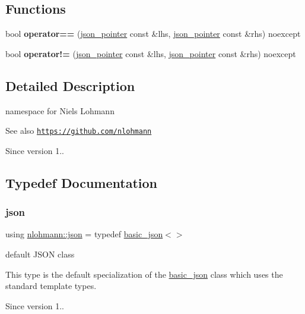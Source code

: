 \subsection*{Functions}
\begin{DoxyCompactItemize}
\item 
\mbox{\label{namespacenlohmann_ab6e16643bf41fc07de3aaa349967d5ef}} 
bool {\bfseries operator==} (\mbox{\hyperlink{classnlohmann_1_1json__pointer}{json\+\_\+pointer}} const \&lhs, \mbox{\hyperlink{classnlohmann_1_1json__pointer}{json\+\_\+pointer}} const \&rhs) noexcept
\item 
\mbox{\label{namespacenlohmann_a455cdb20f9efd12811ec2f6d367e28a5}} 
bool {\bfseries operator!=} (\mbox{\hyperlink{classnlohmann_1_1json__pointer}{json\+\_\+pointer}} const \&lhs, \mbox{\hyperlink{classnlohmann_1_1json__pointer}{json\+\_\+pointer}} const \&rhs) noexcept
\end{DoxyCompactItemize}


\subsection{Detailed Description}
namespace for Niels Lohmann 

\begin{DoxySeeAlso}{See also}
\href{https://github.com/nlohmann}{\tt https\+://github.\+com/nlohmann} 
\end{DoxySeeAlso}
\begin{DoxySince}{Since}
version 1.. 
\end{DoxySince}


\subsection{Typedef Documentation}
\mbox{\label{namespacenlohmann_a2bfd99e845a2e5cd90aeaf1b1431f474}} 
\subsubsection{\texorpdfstring{json}{json}}
{\footnotesize\ttfamily using \mbox{\hyperlink{namespacenlohmann_a2bfd99e845a2e5cd90aeaf1b1431f474}{nlohmann\+::json}} = typedef \mbox{\hyperlink{classnlohmann_1_1basic__json}{basic\+\_\+json}}$<$$>$}



default J\+S\+ON class 

This type is the default specialization of the \mbox{\hyperlink{classnlohmann_1_1basic__json}{basic\+\_\+json}} class which uses the standard template types.

\begin{DoxySince}{Since}
version 1.. 
\end{DoxySince}
